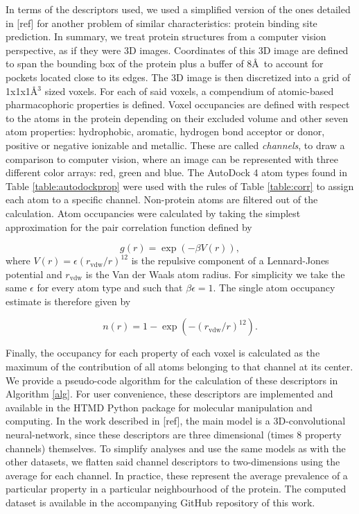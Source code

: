 \documentclass[10pt,a4paper,twoside]{book}
\begin{document}
In terms of the descriptors used, we used a simplified version of the ones detailed in [ref] for another problem of similar characteristics: protein binding site prediction. In summary, we treat protein structures from a computer vision perspective, as if they were 3D images. Coordinates of this 3D image are defined to span the bounding box of the protein plus a buffer of 8\AA\ to account for pockets located close to its edges. The 3D image is then discretized into a grid of 1x1x1\AA$^3$ sized voxels. For each of said voxels, a compendium of atomic-based pharmacophoric properties is defined. Voxel occupancies are defined with respect to the atoms in the protein depending on their excluded volume and other seven atom properties: hydrophobic, aromatic, hydrogen bond acceptor or donor, positive or negative ionizable and metallic. These are called \textit{channels}, to draw a comparison to computer vision, where an image can be represented with three different color arrays: red, green and blue. The AutoDock 4 \cite{Morris2009} atom types found in Table \ref{table:autodockprop} were used with the rules of Table \ref{table:corr} to assign each atom to a specific channel. Non-protein atoms are filtered out of the calculation. Atom occupancies were calculated by taking the simplest approximation for the pair correlation function defined by


\begin{equation}
    g(r) = \exp\left(-\beta V(r)\right), \label{gr_eq}
\end{equation}
where $V(r)=\epsilon (r_\mathrm{vdw}/r)^{12}$ is the repulsive component of a Lennard-Jones potential and $r_{\mathrm{vdw}}$ is the Van der Waals atom radius. For simplicity we take the same $\epsilon$ for every atom type and such that $\beta \epsilon=1$. The single atom occupancy estimate is therefore given by

\begin{equation}
    n(r) = 1-\exp\left(-(r_{\mathrm{vdw}}/r)^{12}\right).
\end{equation}

 Finally, the occupancy for each property of each voxel is calculated as the maximum of the contribution of all atoms belonging to that channel at its center. We provide a pseudo-code algorithm for the calculation of these descriptors in Algorithm \ref{alg}. For user convenience, these descriptors are implemented and available in the HTMD \cite{Doerr2016} Python package for molecular manipulation and computing. In the work described in [ref], the main model is a 3D-convolutional neural-network, since these descriptors are three dimensional (times 8 property channels) themselves. To simplify analyses and use the same models as with the other datasets, we flatten said channel descriptors to two-dimensions using the average for each channel. In practice, these represent the average prevalence of a particular property in a particular neighbourhood of the protein. The computed dataset is available in the accompanying GitHub repository of this work.
 
\end{document}
